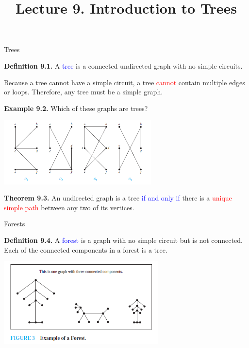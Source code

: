 \documentclass[aspectratio=169]{beamer}
\title{Lecture 9. Introduction to Trees}
\date{}
\providecommand{\Blue}[1]{\textcolor{blue}{#1}}
\providecommand{\Red}[1]{\textcolor{red}{#1}}
\begin{document}
\frame[plain]{\titlepage}

\begin{frame}[plain]{Trees}
  
  {\bf Definition 9.1.} A \Blue{tree} is a connected undirected graph with no simple circuits.
  \pause
  
  \medskip
  
  Because a tree cannot have a simple circuit, a tree \Red{cannot} contain multiple edges or loops.
   Therefore, any tree must be a simple graph. \pause
  \medskip
  
   {\bf Example 9.2.} Which of these graphs are trees?
     \begin{center}
        \includegraphics[height=3.5cm]{./img/lecture9-fig1.png}
      \end{center}
      \pause 
  
    {\bf Theorem 9.3.} An undirected graph is a tree 
    \Blue{if and only if} there is a \Red{unique simple
     path} between any two of its vertices.
     
\end{frame}

\begin{frame}[plain]{Forests}
  
    {\bf Definition 9.4.} A \Blue{forest} is a graph with no simple circuit
      but is not connected. Each of the connected components in a forest is a tree.
     \begin{center}
        \includegraphics[height=4.5cm]{./img/lecture9-fig2.png}
      \end{center}

  
\end{frame}
\end{document}
